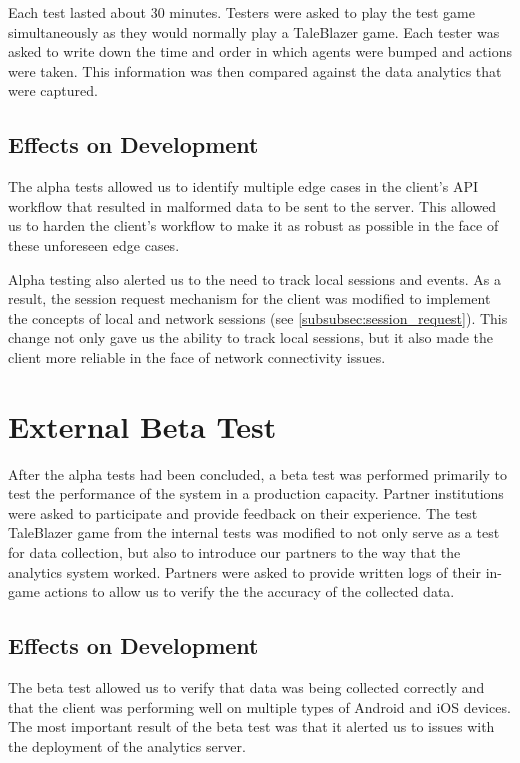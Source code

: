 Each test lasted about 30 minutes. Testers were asked to play the test game simultaneously as they would normally play a TaleBlazer game. Each tester was asked to write down the time and order in which agents were bumped and actions were taken. This information was then compared against the data analytics that were captured. 

\subsection{Effects on Development}

The alpha tests allowed us to identify multiple edge cases in the client's API workflow that resulted in malformed data to be sent to the server. This allowed us to harden the client's workflow to make it as robust as possible in the face of these unforeseen edge cases. 

Alpha testing also alerted us to the need to track local sessions and events. As a result, the session request mechanism for the client was modified to implement the concepts of local and network sessions (see \ref{subsubsec:session_request}). This change not only gave us the ability to track local sessions, but it also made the client more reliable in the face of network connectivity issues. 

\section{External Beta Test}

After the alpha tests had been concluded, a beta test was performed primarily to test the performance of the system in a production capacity. Partner institutions were asked to participate and provide feedback on their experience. The test TaleBlazer game from the internal tests was modified to not only serve as a test for data collection, but also to introduce our partners to the way that the analytics system worked. Partners were asked to provide written logs of their in-game actions to allow us to verify the the accuracy of the collected data.

\subsection{Effects on Development}

The beta test allowed us to verify that data was being collected correctly and that the client was performing well on multiple types of Android and iOS devices. The most important result of the beta test was that it alerted us to issues with the deployment of the analytics server.

